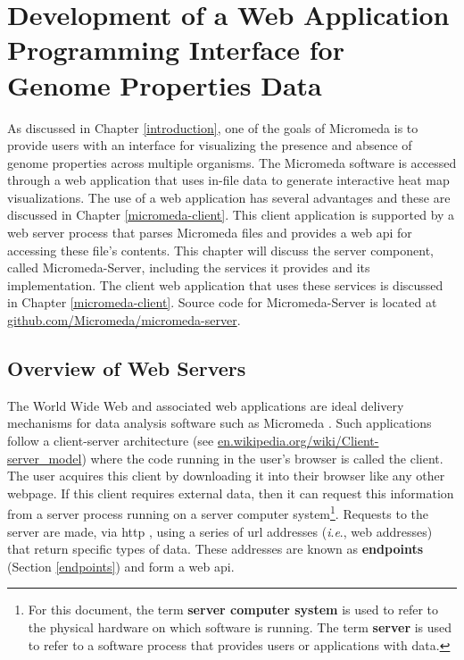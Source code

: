 \chapter{Development of a Web Application Programming Interface for Genome 
Properties Data} \label{micromeda-server}

As discussed in Chapter \ref{introduction}, one of the goals of Micromeda is to 
provide users with an interface for visualizing the presence and absence of 
genome properties across multiple organisms. The Micromeda software is accessed 
through a web application that uses in-file data to generate interactive heat 
map visualizations. The use of a web application has several advantages and 
these are discussed in Chapter \ref{micromeda-client}. This client application 
is supported by a web server process that parses Micromeda files and provides a 
web \gls{api} for accessing these file's contents. This chapter will discuss the 
server component, called Micromeda-Server, including the services it provides 
and its implementation. The client web application that uses these services is 
discussed in Chapter \ref{micromeda-client}. Source code for Micromeda-Server is 
located at 
\href{https://github.com/Micromeda/micromeda-server}{github.com/Micromeda/micromeda-server}.

\section{Overview of Web Servers} \label{web-servers}

The World Wide Web and associated web applications are ideal delivery mechanisms 
for data analysis software such as Micromeda \cite{berners1994world}. Such 
applications follow a client-server architecture \cite{svobodova1985client} (see 
\href{http://en.wikipedia.org/wiki/Client-server_model}{en.wikipedia.org/wiki/Client-server\_model}) 
where the code running in the user's browser is called the client. The user 
acquires this client by downloading it into their browser like any other 
webpage. If this client requires external data, then it can request this information 
from a server process running on a server computer system\footnote{For this 
document, the term \textbf{server computer system} is used to refer to the 
physical hardware on which software is running. The term \textbf{server} is used 
to refer to a software process that provides users or applications with data.}. 
Requests to the server are made, via \gls{http} \cite{fielding1999hypertext}, 
using a series of \gls{url} addresses \cite{berners1994rfc} (\textit{i}.\textit{e}., web 
addresses) that return specific types of data. These addresses are known as 
\textbf{endpoints} (Section \ref{endpoints}) and form a web \gls{api}.

